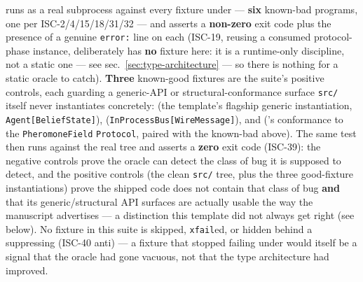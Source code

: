 \documentclass[
  english,
]{article}
\theoremstyle{definition}
\begin{document}
 runs  as a
real subprocess against every fixture under
 --- \textbf{six} known-bad programs, one
per ISC-2/4/15/18/31/32 --- and asserts a \textbf{non-zero} exit code
plus the presence of a genuine \texttt{error:} line on each (ISC-19,
reusing a consumed protocol-phase instance, deliberately has \textbf{no}
fixture here: it is a runtime-only discipline, not a static one --- see
sec.~\ref{sec:type-architecture} --- so there is nothing for a static
oracle to catch). \textbf{Three} known-good fixtures are the suite's
positive controls, each guarding a generic-API or structural-conformance
surface \texttt{src/} itself never instantiates concretely:
 (the template's flagship
generic instantiation, \texttt{Agent{[}BeliefState{]}}),
(\texttt{InProcessBus{[}WireMessage{]}}), and
('s conformance to the
\texttt{PheromoneField} \texttt{Protocol}, paired with the known-bad
 above). The same test
then runs  against the real
 tree and asserts a \textbf{zero} exit
code (ISC-39): the negative controls prove the oracle can detect the
class of bug it is supposed to detect, and the positive controls (the
clean \texttt{src/} tree, plus the three good-fixture instantiations)
prove the shipped code does not contain that class of bug \textbf{and}
that its generic/structural API surfaces are actually usable the way the
manuscript advertises --- a distinction this template did not always get
right (see below). No fixture in this suite is skipped,
\texttt{xfail}ed, or hidden behind a suppressing
 (ISC-40 anti) --- a fixture that stopped
failing under  would itself be a signal that
the oracle had gone vacuous, not that the type architecture had
improved.
\end{document}
